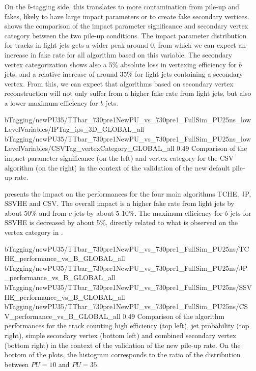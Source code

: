     On the $b$-tagging side, this translates to more contamination from pile-up
    and fakes, likely to have large impact parameters or to create fake
    secondary vertices.   shows
    the comparison of the impact parameter significance and secondary vertex
    category between the two pile-up conditions.  The impact parameter
    distribution for tracks in light jets gets a wider peak around 0, from which
    we can expect an increase in fake rate for all algorithm based on this
    variable. The secondary vertex categorization shows also a 5\% absolute loss
    in vertexing efficiency for $b$ jets, and a relative increase of around 35\%
    for light jets containing a secondary vertex. From this, we can expect that
    algorithms based on secondary vertex reconstruction will not only suffer
    from a higher fake rate from light jets, but also a lower maximum efficiency
    for $b$ jets.

                     {bTagging/newPU35/TTbar_730pre1NewPU_vs_730pre1_FullSim_PU25ns_lowLevelVariables/IPTag_ips_3D_GLOBAL_all}
                     {bTagging/newPU35/TTbar_730pre1NewPU_vs_730pre1_FullSim_PU25ns_lowLevelVariables/CSVTag_vertexCategory_GLOBAL_all}
                     {0.49}
                     {Comparison of the impact parameter significance (on the left)
                     and vertex category for the CSV algorithm (on the right) in the
                     context of the validation of the new default pile-up rate.}

     presents the impact on the
    performances for the four main algorithms TCHE, JP, SSVHE and CSV. The
    overall impact is a higher fake rate from light jets by about 50\% and from
    $c$ jets by about 5-10\%. The maximum efficiency for $b$ jets for SSVHE is
    decreased by about 5\%, directly related to what is observed on the vertex
    category in .

                      {bTagging/newPU35/TTbar_730pre1NewPU_vs_730pre1_FullSim_PU25ns/TCHE_performance_vs_B_GLOBAL_all}
                      {bTagging/newPU35/TTbar_730pre1NewPU_vs_730pre1_FullSim_PU25ns/JP_performance_vs_B_GLOBAL_all}
                      {bTagging/newPU35/TTbar_730pre1NewPU_vs_730pre1_FullSim_PU25ns/SSVHE_performance_vs_B_GLOBAL_all}
                      {bTagging/newPU35/TTbar_730pre1NewPU_vs_730pre1_FullSim_PU25ns/CSV_performance_vs_B_GLOBAL_all}
                      {0.49}
                      {Comparison of the algorithm performances for the track
                      counting high efficiency (top left), jet probability (top
                      right), simple secondary vertex (bottom left) and combined
                      secondary vertex (bottom right) in the context of the
                      validation of the new pile-up rate. On the bottom of the
                      plots, the histogram corresponds to the ratio of the
                      distribution between $PU = 10$ and $PU = 35$.}

